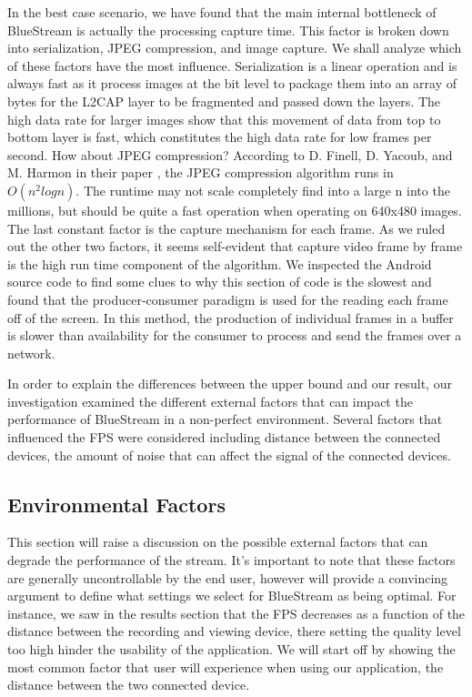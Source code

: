 \documentclass[a4paper,12pt]{article}
\begin{document}
In the best case scenario, we have found that the main internal bottleneck of BlueStream is actually the processing capture time. This factor is broken down into serialization, JPEG compression, and image capture. We shall analyze which of these factors have the most influence. Serialization is a linear operation and is always fast as it process images at the bit level to package them into an array of bytes for the L2CAP layer to be fragmented and passed down the layers. The high data rate for larger images show that this movement of data from top to bottom layer is fast, which constitutes the high data rate for low frames per second. How about JPEG compression? According to D. Finell, D. Yacoub, and M. Harmon in their paper \cite{JPEGCompression}, the JPEG compression algorithm runs in $O(n^2 logn)$. The runtime may not scale completely find into a large n into the millions, but should be quite a fast operation when operating on 640x480 images. The last constant factor is the capture mechanism for each frame. As we ruled out the other two factors, it seems self-evident that capture video frame by frame is the high run time component of the algorithm. We inspected the Android source code to find some clues to why this section of code is the slowest and found that the producer-consumer paradigm is used for the reading each frame off of the screen. In this method, the production of individual frames in a buffer is slower than availability for the consumer to process and send the frames over a network.  
    
In order to explain the differences between the upper bound and our result, our investigation examined the different external factors that can impact the performance of BlueStream in a non-perfect environment. Several factors that influenced the FPS were considered including distance between the connected devices, the amount of noise that can affect the signal of the connected devices. 

\subsection{Environmental Factors}
This section will raise a discussion on the possible external factors that can degrade the performance of the stream. It's important to note that these factors are generally uncontrollable by the end user, however will provide a convincing argument to define what settings we select for BlueStream as being optimal. For instance, we saw in the results section that the FPS decreases as a function of the distance between the recording and viewing device, there setting the quality level too high hinder the usability of the application. We will start off by showing the most common factor that user will experience when using our application, the distance between the two connected device.
\end{document}
